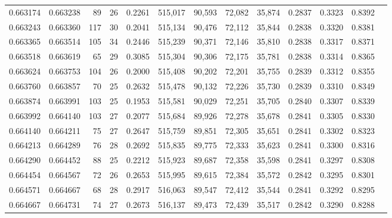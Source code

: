 \begin{tabular}{rrrrrrrrrrrrr}
0.663174 & 0.663238 &    89 &  26 &                                     0.2261 & 515,017 &  90,593 &  72,082 &  35,874 & 0.2837 & 0.3323 & 0.8392 \\
0.663243 & 0.663360 &   117 &  30 &                                     0.2041 & 515,134 &  90,476 &  72,112 &  35,844 & 0.2838 & 0.3320 & 0.8381 \\
0.663365 & 0.663514 &   105 &  34 &                                     0.2446 & 515,239 &  90,371 &  72,146 &  35,810 & 0.2838 & 0.3317 & 0.8371 \\
0.663518 & 0.663619 &    65 &  29 &                                     0.3085 & 515,304 &  90,306 &  72,175 &  35,781 & 0.2838 & 0.3314 & 0.8365 \\
0.663624 & 0.663753 &   104 &  26 &                                     0.2000 & 515,408 &  90,202 &  72,201 &  35,755 & 0.2839 & 0.3312 & 0.8355 \\
0.663760 & 0.663857 &    70 &  25 &                                     0.2632 & 515,478 &  90,132 &  72,226 &  35,730 & 0.2839 & 0.3310 & 0.8349 \\
0.663874 & 0.663991 &   103 &  25 &                                     0.1953 & 515,581 &  90,029 &  72,251 &  35,705 & 0.2840 & 0.3307 & 0.8339 \\
0.663992 & 0.664140 &   103 &  27 &                                     0.2077 & 515,684 &  89,926 &  72,278 &  35,678 & 0.2841 & 0.3305 & 0.8330 \\
0.664140 & 0.664211 &    75 &  27 &                                     0.2647 & 515,759 &  89,851 &  72,305 &  35,651 & 0.2841 & 0.3302 & 0.8323 \\
0.664213 & 0.664289 &    76 &  28 &                                     0.2692 & 515,835 &  89,775 &  72,333 &  35,623 & 0.2841 & 0.3300 & 0.8316 \\
0.664290 & 0.664452 &    88 &  25 &                                     0.2212 & 515,923 &  89,687 &  72,358 &  35,598 & 0.2841 & 0.3297 & 0.8308 \\
0.664454 & 0.664567 &    72 &  26 &                                     0.2653 & 515,995 &  89,615 &  72,384 &  35,572 & 0.2842 & 0.3295 & 0.8301 \\
0.664571 & 0.664667 &    68 &  28 &                                     0.2917 & 516,063 &  89,547 &  72,412 &  35,544 & 0.2841 & 0.3292 & 0.8295 \\
0.664667 & 0.664731 &    74 &  27 &                                     0.2673 & 516,137 &  89,473 &  72,439 &  35,517 & 0.2842 & 0.3290 & 0.8288 \\

\end{tabular}
